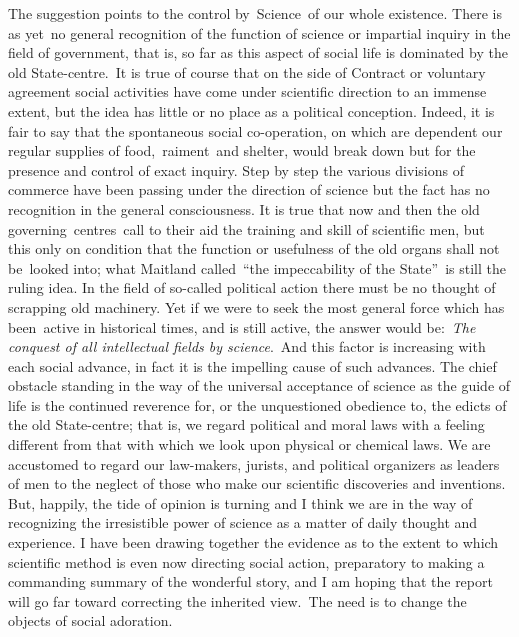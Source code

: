 \documentclass[twoside,symmetric,nobib,justified]{tufte-book}
\begin{document}
The suggestion points to the control by~Science~of our whole
existence. There is as yet~no general recognition of the function of
science or impartial inquiry in the field of government, that is, so far
as this aspect of social life is dominated by the old State-centre.~It
is true of course that on the side of Contract or voluntary agreement
social activities have come under scientific direction to an immense
extent, but the idea has little or no place as a political conception.
Indeed, it is fair to say that the spontaneous social co-operation, on
which are dependent our regular supplies of food,~raiment~and shelter,
would break down but for the presence and control of exact inquiry. Step
by step the various divisions of commerce have been passing under the
direction of science but the fact has no recognition in the general
consciousness. It is true that now and then the old
governing~centres~call to their aid the training and skill of scientific
men, but this only on condition that the function or usefulness of the
old organs shall not be~looked into; what Maitland called~``the
impeccability of the State''~is still the ruling idea. In the field of
so-called political action there must be no thought of scrapping old
machinery. Yet if we were to seek the most general force which has
been~active in historical times, and is still active, the answer would
be:~\emph{The conquest of all intellectual fields by science}.~And this
factor is increasing with each social advance, in fact it is the
impelling cause of such advances. The chief obstacle standing in the way
of the universal acceptance of science as the guide of life is the
continued reverence for, or the unquestioned obedience to, the edicts of
the old State-centre; that is, we regard political and moral laws with a
feeling different from that with which we look upon physical or chemical
laws. We are accustomed to regard our law-makers, jurists, and political
organizers as leaders of men to the neglect of those who make our
scientific discoveries and inventions. But, happily, the tide of opinion
is turning and I think we are in the way of recognizing the irresistible
power of science as a matter of daily thought and experience. I have
been drawing together the evidence as to the extent to which scientific
method is even now directing social action, preparatory to making a
commanding summary of the wonderful story, and I am hoping that the
report will go far toward correcting the inherited view.~The need is to
change the objects of social adoration.~
\end{document}
